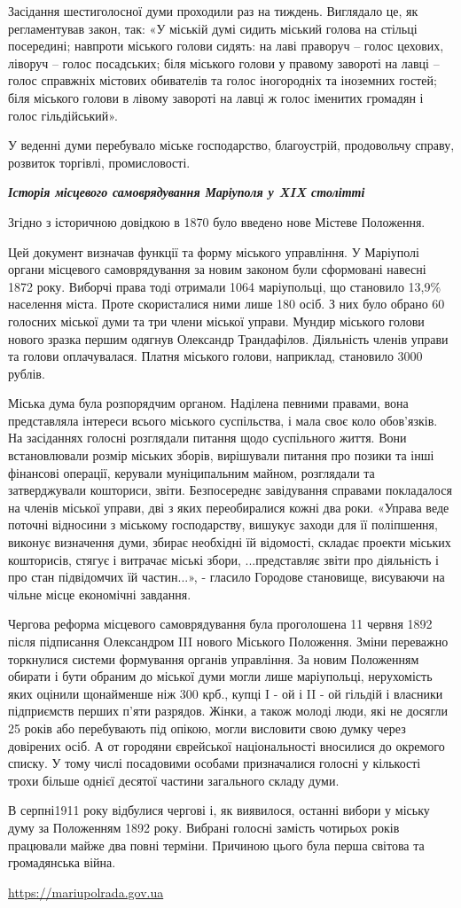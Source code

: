 Засідання шестиголосної думи проходили раз на тиждень. Виглядало це, як
регламентував закон, так: «У міській думі сидить міський голова на стільці
посередині; навпроти міського голови сидять: на лаві праворуч – голос цехових,
ліворуч – голос посадських; біля міського голови у правому завороті на лавці –
голос справжніх містових обивателів та голос іногородніх та іноземних гостей;
біля міського голови в лівому завороті на лавці ж голос іменитих громадян і
голос гільдійський».

У веденні думи перебувало міське господарство, благоустрій, продовольчу справу,
розвиток торгівлі, промисловості.

\textbf{\emph{Історія місцевого самоврядування Маріуполя у XIX столітті}}

Згідно з історичною довідкою в 1870 було введено нове Містеве Положення.

Цей документ визначав функції та форму міського управління. У Маріуполі органи
місцевого самоврядування за новим законом були сформовані навесні 1872 року.
Виборчі права тоді отримали 1064 маріупольці, що становило 13,9\% населення
міста. Проте скористалися ними лише 180 осіб. З них було обрано 60 голосних
міської думи та три члени міської управи. Мундир міського голови нового зразка
першим одягнув Олександр Трандафілов. Діяльність членів управи та голови
оплачувалася. Платня міського голови, наприклад, становило 3000 рублів.

Міська дума була розпорядчим органом. Наділена певними правами, вона
представляла інтереси всього міського суспільства, і мала своє коло обов'язків.
На засіданнях голосні розглядали питання щодо суспільного життя. Вони
встановлювали розмір міських зборів, вирішували питання про позики та інші
фінансові операції, керували муніципальним майном, розглядали та затверджували
кошториси, звіти. Безпосереднє завідування справами покладалося на членів
міської управи, дві з яких переобиралися кожні два роки. «Управа веде поточні
відносини з міському господарству, вишукує заходи для її поліпшення, виконує
визначення думи, збирає необхідні їй відомості, складає проекти міських
кошторисів, стягує і витрачає міські збори, ...представляє звіти про діяльність і
про стан підвідомчих їй частин...», - гласило Городове становище, висуваючи на
чільне місце економічні завдання.

Чергова реформа місцевого самоврядування була проголошена 11 червня 1892 після
підписання Олександром III нового Міського Положення. Зміни переважно
торкнулися системи формування органів управління. За новим Положенням обирати і
бути обраним до міської думи могли лише маріупольці, нерухомість яких оцінили
щонайменше ніж 300 крб., купці I - ой і II - ой гільдій і власники підприємств
перших п'яти разрядов. Жінки, а також молоді люди, які не досягли 25 років або
перебувають під опікою, могли висловити свою думку через довірених осіб. А от
городяни єврейської національності вносилися до окремого списку. У тому числі
посадовими особами призначалися голосні у кількості трохи більше однієї десятої
частини загального складу думи.

В серпні1911 року відбулися чергові і, як виявилося, останні вибори у міську
думу за Положенням 1892 року. Вибрані голосні замість чотирьох років працювали
майже два повні терміни. Причиною цього була перша світова та громадянська
війна.

\url{https://mariupolrada.gov.ua}
